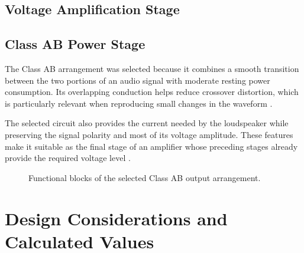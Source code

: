 \documentclass[conference,letterpaper]{IEEEtran}
\newcommand{\Ohm}{\Omega}
\begin{document}
\subsection{Voltage Amplification Stage}

\subsection{Class AB Power Stage}

The Class AB arrangement was selected because it combines a smooth
transition between the two portions of an audio signal with moderate
resting power consumption. Its overlapping conduction helps reduce
crossover distortion, which is particularly relevant when reproducing
small changes in the waveform \cite[sec.~7--2]{floyd}.

The selected circuit also provides the current needed by the
loudspeaker while preserving the signal polarity and most of its
voltage amplitude. These features make it suitable as the final stage
of an amplifier whose preceding stages already provide the required
voltage level \cite[sec.~9--2]{floyd}.

\begin{figure}[H]
\centering
{}
\caption{Functional blocks of the selected Class AB output arrangement.}
\label{fig:powerblock}
\end{figure}
\FloatBarrier

\section{Design Considerations and Calculated Values}
\end{document}
